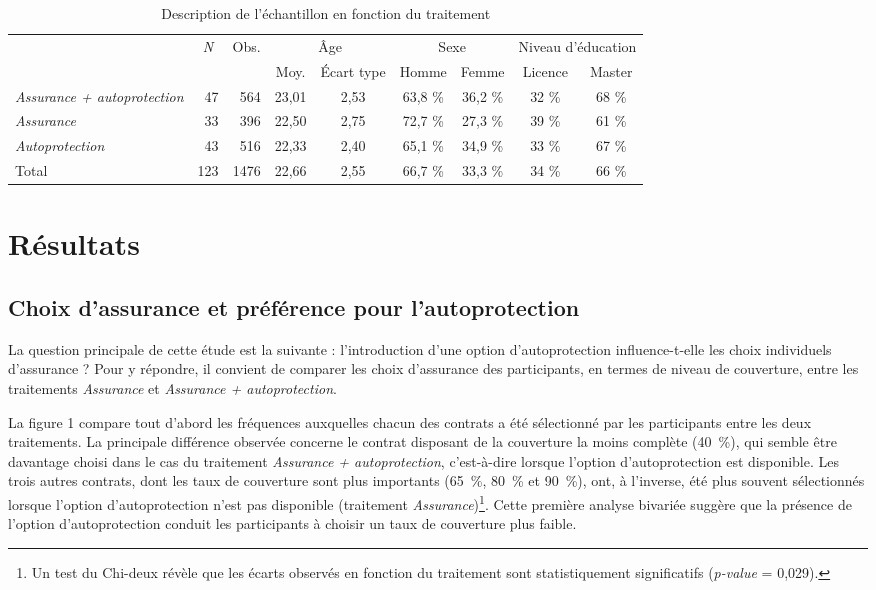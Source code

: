 \begin{Article}
\begin{refsection}[Mouminoux]
\begin{table}[h]
  \caption{Description de l'échantillon en fonction du traitement}
    \label{tab:sample}
    \tabcolsep=2pt
    \begin{tabular}[c]{lrrcccccc}
    \toprule
            & \multicolumn{1}{c}{\emph{N}}& \multicolumn{1}{c}{Obs.}& \multicolumn{2}{c}{Âge} & \multicolumn{2}{c}{Sexe} & \multicolumn{2}{c}{Niveau d'éducation}\\
            & & & Moy. & Écart type & Homme & Femme & Licence & Master \\
    \midrule
    \textit{Assurance + autoprotection} & 47 & 564 & 23,01 & 2,53 & 63,8 \% & 36,2 \% & 32 \% & 68 \% \\
    \textit{Assurance} & 33 & 396 & 22,50 & 2,75 & 72,7 \% & 27,3 \% & 39 \% & 61 \%\\
    \textit{Autoprotection} & 43 & 516 & 22,33 & 2,40 & 65,1 \% & 34,9 \% & 33 \% & 67 \% \\
    Total & 123 & 1476 & 22,66 & 2,55 & 66,7 \% & 33,3 \% & 34 \% & 66 \%\\
    \bottomrule
    \end{tabular}
\end{table}


\section{Résultats}
\label{section:resultats}

\subsection{Choix d'assurance et préférence pour l'autoprotection}

La question principale de cette étude est la suivante : l'introduction d'une option d'autoprotection influence-t-elle les choix  individuels d'assurance ? Pour y répondre, il convient de comparer les choix d'assurance des participants, en termes de niveau de couverture, entre les traitements \textit{Assurance} et \textit{Assurance + autoprotection}.

La figure 1 compare tout d'abord les fréquences auxquelles chacun des contrats a été sélectionné par les participants entre les deux traitements. La principale différence observée concerne le contrat disposant de la couverture la moins complète (40~\%), qui semble être davantage choisi dans le cas du traitement \textit{Assurance + autoprotection}, c'est-à-dire lorsque l'option d'autoprotection est disponible. Les trois autres contrats, dont les taux de couverture sont plus importants (65~\%, 80~\% et 90~\%), ont, à l'inverse, été plus souvent sélectionnés lorsque l'option d'autoprotection n'est pas disponible (traitement \textit{Assurance})\footnote{Un test du Chi-deux révèle que les écarts observés en fonction du traitement sont statistiquement significatifs (\textit{p-value} = 0,029).}. Cette première analyse bivariée suggère que la présence de l'option d'autoprotection conduit les participants à choisir un taux de couverture plus faible.


\end{refsection}
\end{Article}
